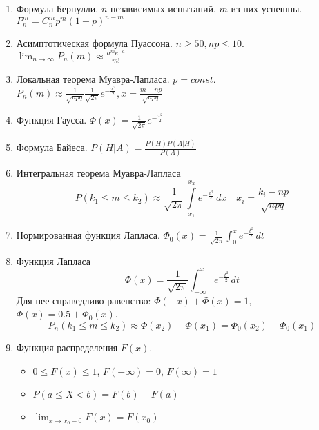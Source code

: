 \documentclass{article}
\begin{document}
\begin{multicols}{2}
    \begin{enumerate}
        \item Формула Бернулли. $n$ независимых испытаний, $m$ из них успешны.
        $
            P_n^m = C_n^m p^m (1-p)^{n-m}
        $

    \item Асимптотическая формула Пуассона. $n \geq 50, np \leq 10$.
        $ \lim_{n \to \infty} P_n(m) \approx \frac{a^m e^{-a}}{m!} $

    \item Локальная теорема Муавра-Лапласа. $p = const$.
        $ P_n(m) \approx \frac{1}{\sqrt{npq}} \frac{1}{\sqrt{2 \pi}} e^{-\frac{x^2}{2}}, x = \frac{m-np}{\sqrt{npq}} $

    \item Функция Гаусса.
        $
            \Phi(x) = \frac{1}{\sqrt{2\pi}} e^{-\frac{x^2}{2}}
        $

    \item Формула Байеса.
        $
            P(H|A) = \frac{P(H) P(A | H)}{P(A)}
        $

    \item Интегральная теорема Муавра-Лапласа
        \[
            P(k_1 \leq m \leq k_2) \approx \frac{1}{\sqrt{2\pi}} \int\limits_{x_1}^{x_2} e^{-\frac{x^2}{2}} \, dx
            \quad
            x_i = \frac{k_i - np}{\sqrt{npq}}
        \]
    \item Нормированная функция Лапласа.
        $
            \Phi_0(x) = \frac{1}{\sqrt{2 \pi}} \int_0^x e^{-\frac{t^2}{2}} \, dt
        $

    \item Функция Лапласа
        \[
            \Phi(x) = \frac{1}{\sqrt{2 \pi}} \int_{-\infty}^x e^{-\frac{t^2}{2}} \, dt
        \]
        Для нее справедливо равенство: $\Phi(-x) + \Phi(x) = 1$, $\Phi(x) = 0.5 + \Phi_0(x)$.
        \[
            P_n(k_1 \leq m \leq k_2) \approx \Phi(x_2) - \Phi(x_1) = \Phi_0(x_2) - \Phi_0(x_1)
        \]

    \item Функция распределения $F(x)$.
        \begin{itemize}
            \item $0 \leq F(x) \leq 1$, $F(-\infty) = 0$, $F(\infty) = 1$
            \item $P(a \leq X < b) = F(b) - F(a)$
            \item $\lim_{x \to x_0 - 0} F(x) = F(x_0)$
        \end{itemize}


\end{enumerate}
\end{multicols}
\end{document}
